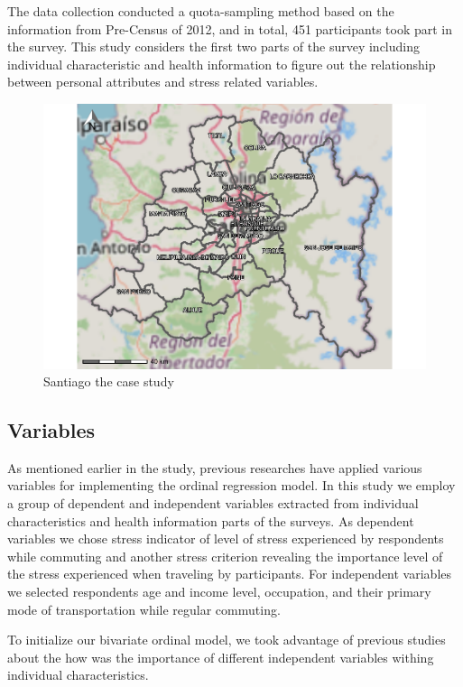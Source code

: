 \documentclass[
11pt, %
oneside, %
english, %
singlespacing, %
]{macthesis} %
\begin{document}
The data collection conducted a quota-sampling method based on the information from Pre-Census of 2012, and in total, 451 participants took part in the survey. This study considers the first two parts of the survey including individual characteristic and health information to figure out the relationship between personal attributes and stress related variables.
\begin{figure}

{\centering \includegraphics[width=0.85\linewidth]{thesis_files/figure-latex/unnamed-chunk-19-1} 

}

\caption{\label{fig:study boundaries}Santiago the case study}\label{fig:unnamed-chunk-19}
\end{figure}
\hypertarget{variables}{%
\subsection{Variables}\label{variables}}

As mentioned earlier in the study, previous researches have applied various variables for implementing the ordinal regression model. In this study we employ a group of dependent and independent variables extracted from individual characteristics and health information parts of the surveys. As dependent variables we chose stress indicator of level of stress experienced by respondents while commuting and another stress criterion revealing the importance level of the stress experienced when traveling by participants. For independent variables we selected respondents age and income level, occupation, and their primary mode of transportation while regular commuting.

To initialize our bivariate ordinal model, we took advantage of previous studies about the how was the importance of different independent variables withing individual characteristics.
\end{document}
